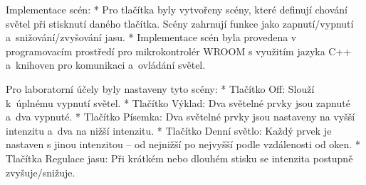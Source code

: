\medskip
\noindent
{\sbf Implementace scén:}
\begitems
    * Pro tlačítka byly vytvořeny scény, které definují chování světel při stisknutí daného tlačítka.
        Scény zahrnují funkce jako zapnutí/vypnutí a~snižování/zvyšování jasu.
    * Implementace scén byla provedena v programovacím prostředí pro mikrokontrolér  WROOM
        s využitím jazyka C++ a~knihoven pro komunikaci a~ovládání světel.
\enditems


\medskip
\noindent
{\sbf Pro laboratorní účely byly nastaveny tyto scény:}
\begitems
    * Tlačítko {\sbf Off:} Slouží k~úplnému vypnutí světel.
    * Tlačítko {\sbf Výklad:} Dva světelné prvky jsou zapnuté a~dva vypnuté.
    * Tlačítko {\sbf Písemka:} Dva světelné prvky jsou nastaveny na vyšší intenzitu a~dva na nižší intenzitu.
    * Tlačítko {\sbf Denní světlo:} Každý prvek je nastaven s jinou intenzitou -- od nejnižší po nejvyšší podle vzdálenosti od oken.
    * Tlačítka {\sbf Regulace jasu:} Při krátkém nebo dlouhém stisku se intenzita postupně zvyšuje/snižuje.
\enditems





